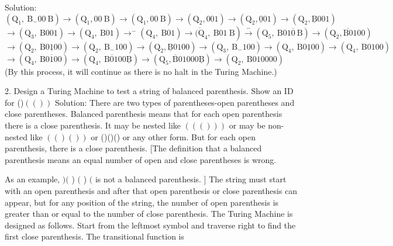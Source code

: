 \documentclass[8pt]{report}
\begin{document}
      Solution: $\left(\mathrm{Q}_{1}, \mathrm{~B}_{-} 00 \mathrm{~B}\right) \rightarrow\left(\mathrm{Q}_{1}, 00 \mathrm{~B}\right) \rightarrow\left(\mathrm{Q}_{1}, 00 \mathrm{~B}\right) \rightarrow\left(\mathrm{Q}_{2}, 001\right) \rightarrow\left(\mathrm{Q}_{2}, \underline{0} 01\right) \rightarrow\left(\mathrm{Q}_{2}, \underline{\mathrm{B}} 001\right)$
$\left.\rightarrow\left(\mathrm{Q}_{3}, \mathrm{~B} 001\right) \rightarrow\left(\mathrm{Q}_{4}, \mathrm{~B} 01\right) \rightarrow^{-}\left(\mathrm{Q}_{4}, \mathrm{~B} 01\right) \rightarrow \overline{(\mathrm{Q}}_{4}, \mathrm{~B} 01 \mathrm{~B}\right) \stackrel{-}{\rightarrow}\left(\mathrm{Q}_{5}, \mathrm{~B} 01 \overline{0} \mathrm{~B}\right) \rightarrow\left(\mathrm{Q}_{2}, \overline{\mathrm{B} 0} 100\right)$
$\rightarrow\left(\mathrm{Q}_{2}, \mathrm{~B} 0 \underline{1} 00\right) \rightarrow\left(\mathrm{Q}_{2}, \mathrm{~B}_{-} 100\right) \rightarrow\left(\mathrm{Q}_{2}, \underline{\mathrm{B}} 0100\right) \rightarrow\left(\mathrm{Q}_{3}, \mathrm{~B}_{-} 100\right) \rightarrow\left(\mathrm{Q}_{4}, \mathrm{~B} 0 \underline{1} 00\right) \rightarrow\left(\mathrm{Q}_{4}, \mathrm{~B} 0100\right)$
$\rightarrow\left(\mathrm{Q}_{4}, \mathrm{~B} 0 \overline{1} 00\right) \rightarrow\left(\mathrm{Q}_{4}, \mathrm{~B} \overline{0} 100 \underline{\mathrm{B}}\right) \rightarrow\left(\mathrm{Q}_{5}, \overline{\mathrm{B}} 01000 \underline{\mathrm{B}}\right) \rightarrow\left(\mathrm{Q}_{2}, \mathrm{~B} 010000\right)$
(By this process, it will continue as there is no halt in the Turing Machine.)




2. Design a Turing Machine to test a string of balanced parenthesis. Show an ID for ()$(())$
Solution: There are two types of parentheses-open parentheses and close parentheses. Balanced parenthesis means that for each open parenthesis there is a close parenthesis. It may be nested like $((()))$ or may be non-nested like $(()())$ or ()()() or any other form. But for each open parenthesis, there is a close parenthesis. [The definition that a balanced parenthesis means an equal number of open and close parentheses is wrong.

As an example, $)($ ) $($ ) $($ is not a balanced parenthesis. $]$ The string must start with an open parenthesis and after that open parenthesis or close parenthesis can appear, but for any position of the string, the number of open parenthesis is greater than or equal to the number of close parenthesis. The Turing Machine is designed as follows. Start from the leftmost symbol and traverse right to find the first close parenthesis. The transitional function is
\end{document}
